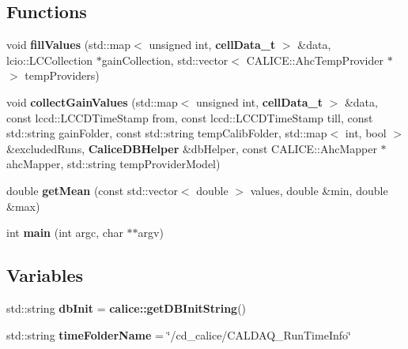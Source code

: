 \subsection*{Functions}
\begin{DoxyCompactItemize}
\item 
void {\bfseries fill\-Values} (std\-::map$<$ unsigned int, {\bf cell\-Data\-\_\-t} $>$ \&data, lcio\-::\-L\-C\-Collection $\ast$gain\-Collection, std\-::vector$<$ C\-A\-L\-I\-C\-E\-::\-Ahc\-Temp\-Provider $\ast$ $>$ temp\-Providers)\label{extractGainAverage_8cc_a1ac5935dd79bf264db3a460c79b3b05a}

\item 
void {\bfseries collect\-Gain\-Values} (std\-::map$<$ unsigned int, {\bf cell\-Data\-\_\-t} $>$ \&data, const lccd\-::\-L\-C\-C\-D\-Time\-Stamp from, const lccd\-::\-L\-C\-C\-D\-Time\-Stamp till, const std\-::string gain\-Folder, const std\-::string temp\-Calib\-Folder, std\-::map$<$ int, bool $>$ \&excluded\-Runs, {\bf Calice\-D\-B\-Helper} \&db\-Helper, const C\-A\-L\-I\-C\-E\-::\-Ahc\-Mapper $\ast$ahc\-Mapper, std\-::string temp\-Provider\-Model)\label{extractGainAverage_8cc_a43922251ebb7273c8d4d86d26f402805}

\item 
double {\bfseries get\-Mean} (const std\-::vector$<$ double $>$ values, double \&min, double \&max)\label{extractGainAverage_8cc_afaa7d8373bf0feb2a1f23ac6ad09506b}

\item 
int {\bfseries main} (int argc, char $\ast$$\ast$argv)\label{extractGainAverage_8cc_a3c04138a5bfe5d72780bb7e82a18e627}

\end{DoxyCompactItemize}
\subsection*{Variables}
\begin{DoxyCompactItemize}
\item 
std\-::string {\bfseries db\-Init} = {\bf calice\-::get\-D\-B\-Init\-String}()\label{extractGainAverage_8cc_a6b6249ff0366b8a48c34dfbbf6c6fbec}

\item 
std\-::string {\bfseries time\-Folder\-Name} = \char`\"{}/cd\-\_\-calice/C\-A\-L\-D\-A\-Q\-\_\-\-Run\-Time\-Info\char`\"{}\label{extractGainAverage_8cc_a4d2cd635f803f7649a78988cdd8b70b9}

\end{DoxyCompactItemize}


